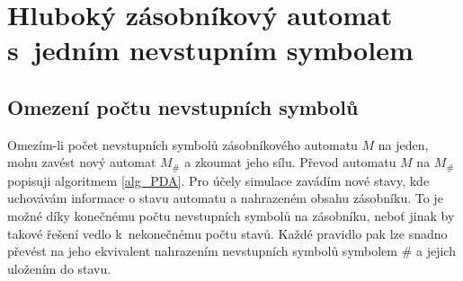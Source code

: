 \chapter{Hluboký zásobníkový automat s~jedním nevstupním symbolem}


\section{Omezení počtu nevstupních symbolů}\label{section_deep_pda_nonterm}

Omezím-li počet nevstupních symbolů zásobníkového automatu $M$ na jeden, mohu zavést nový automat $M_\#$ a zkoumat jeho sílu. Převod automatu $M$ na  $M_\#$ popisuji algoritmem \ref{alg_PDA}. Pro účely simulace zavádím nové stavy, kde uchovávám informace o stavu automatu a nahrazeném obsahu zásobníku. To je možné díky konečnému počtu nevstupních symbolů na zásobníku, neboť jinak by takové řešení vedlo k~nekonečnému počtu stavů. Každé pravidlo pak lze snadno převést na jeho ekvivalent nahrazením nevstupních symbolů symbolem $\#$ a jejich uložením do stavu.


